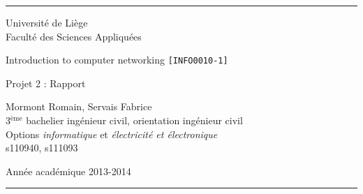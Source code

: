 \documentclass[a4paper,11pt]{article}
\begin{document}
\rule{1\linewidth}{1px}
{ \sc
\begin{center}
{\small Université de Liège}\\
{\small Faculté des Sciences Appliquées}

\end{center}

\vfill
\begin{center}

{\Huge Introduction to computer networking {\LARGE \tt [INFO0010-1]}\\}
\end{center}
\begin{center}
{\Huge Projet 2 : Rapport}
\end{center}
\begin{center}
Mormont Romain, Servais Fabrice\\
{\small 3$^{\text{ème}}$  bachelier ingénieur civil, orientation ingénieur civil}\\
{\small Options \textit{informatique} et \textit{électricité et électronique}}\\
{\small s110940, s111093}
\end{center}

\vfill
\begin{center}
Année académique 2013-2014\\
\end{center}
}
\rule{1\linewidth}{1px}
\newpage
\end{document}
